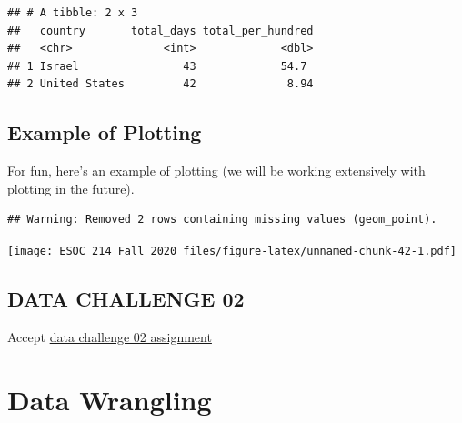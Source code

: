 \documentclass[
]{book}
\newenvironment{Shaded}{\begin{snugshade}}{\end{snugshade}}
\newcommand{\DataTypeTok}[1]{\textcolor[rgb]{0.13,0.29,0.53}{#1}}
\newcommand{\KeywordTok}[1]{\textcolor[rgb]{0.13,0.29,0.53}{\textbf{#1}}}
\newcommand{\NormalTok}[1]{#1}
\newcommand{\OperatorTok}[1]{\textcolor[rgb]{0.81,0.36,0.00}{\textbf{#1}}}
\newcommand{\StringTok}[1]{\textcolor[rgb]{0.31,0.60,0.02}{#1}}
\begin{document}
\begin{verbatim}
## # A tibble: 2 x 3
##   country       total_days total_per_hundred
##   <chr>              <int>             <dbl>
## 1 Israel                43             54.7 
## 2 United States         42              8.94
\end{verbatim}

\hypertarget{example-of-plotting}{%
\section{Example of Plotting}\label{example-of-plotting}}

For fun, here's an example of plotting (we will be working extensively with plotting in the future).

\begin{Shaded}
\end{Shaded}

\begin{verbatim}
## Warning: Removed 2 rows containing missing values (geom_point).
\end{verbatim}

\texttt{[image: ESOC\_214\_Fall\_2020\_files/figure-latex/unnamed-chunk-42-1.pdf]}

\hypertarget{data-challenge-02}{%
\section{DATA CHALLENGE 02}\label{data-challenge-02}}

Accept \href{https://classroom.github.com/a/h4Hgow-M}{data challenge 02 assignment}

\hypertarget{data-wrangling}{%
\chapter{Data Wrangling}\label{data-wrangling}}
\end{document}
